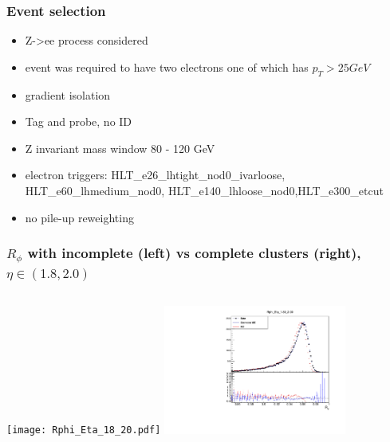 \documentclass{beamer}
\begin{document}
\begin{frame}
\frametitle{Event selection}

\begin{itemize}
\item Z->ee process considered
\item event was required to have two electrons one of which has $p_T>25GeV$
\item  gradient isolation
\item  Tag and probe, no ID 
\item  Z invariant mass window 80 - 120 GeV 
\item  electron triggers: HLT\_e26\_lhtight\_nod0\_ivarloose, HLT\_e60\_lhmedium\_nod0, HLT\_e140\_lhloose\_nod0,HLT\_e300\_etcut
\item no pile-up reweighting
\end{itemize}



\end{frame}
\begin{frame}
\frametitle{$R_\phi$ with incomplete  (left) vs complete clusters (right), $\eta \in (1.8, 2.0)$ }

\begin{columns}[t]
\centering
\texttt{[image: Rphi\_Eta\_18\_20.pdf]}
\centering
\includegraphics[width=6cm]{Rphi_Eta_18_20_Athena.pdf}
\end{columns}
\end{frame}
\end{document}
